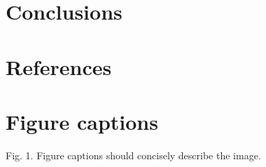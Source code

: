 \documentclass[12pt,letterpaper]{article}
\begin{document}
\begin{flushleft}
\section{Conclusions}

\section*{References}


	
%	
%	
%
%	
	
	
	
		
	
	

\newpage %
\section*{Figure captions}
Fig. 1. Figure captions should concisely describe the image.


\end{flushleft}
\end{document}
